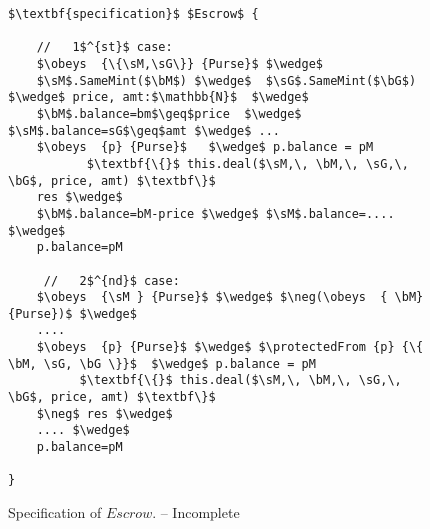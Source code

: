 \begin{figure*}[t]
\begin{lstlisting}[mathescape=true, language=Chainmail, frame=lines]
$\textbf{specification}$ $Escrow$ {
    
    //   1$^{st}$ case:
    $\obeys  {\{\sM,\sG\}} {Purse}$ $\wedge$ 
    $\sM$.SameMint($\bM$) $\wedge$  $\sG$.SameMint($\bG$)  $\wedge$ price, amt:$\mathbb{N}$  $\wedge$
    $\bM$.balance=bm$\geq$price  $\wedge$  $\sM$.balance=sG$\geq$amt $\wedge$ ...
    $\obeys  {p} {Purse}$   $\wedge$ p.balance = pM
           $\textbf{\{}$ this.deal($\sM,\, \bM,\, \sG,\, \bG$, price, amt) $\textbf\}$
    res $\wedge$
    $\bM$.balance=bM-price $\wedge$ $\sM$.balance=....  $\wedge$
    p.balance=pM

     //   2$^{nd}$ case:
    $\obeys  {\sM } {Purse}$ $\wedge$ $\neg(\obeys  { \bM} {Purse})$ $\wedge$ 
    ....
    $\obeys  {p} {Purse}$ $\wedge$ $\protectedFrom {p} {\{ \bM, \sG, \bG \}}$  $\wedge$ p.balance = pM
          $\textbf{\{}$ this.deal($\sM,\, \bM,\, \sG,\, \bG$, price, amt) $\textbf\}$
    $\neg$ res $\wedge$
    .... $\wedge$
    p.balance=pM
     
}

\end{lstlisting}
\caption{Specification of  $Escrow$. -- Incomplete}
\label{fig:EscrowSpec}
 \end{figure*}